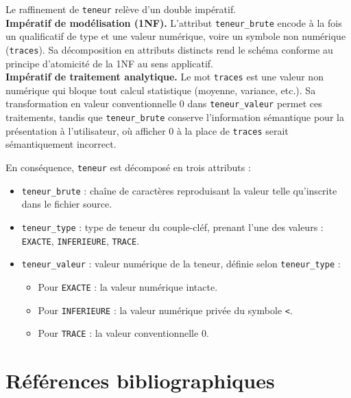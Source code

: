 \documentclass[12pt, a4paper]{article}
\newcommand{\attr}[1]{\texttt{#1}}
\begin{document}
    \begin{notebox}
        \small
        Le raffinement de \attr{teneur} relève d'un double impératif.\\[0.3em]
        \textbf{Impératif de modélisation (1NF).} L'attribut \attr{teneur\_brute} encode à la fois un
        qualificatif de type et une valeur numérique, voire un symbole non numérique (\texttt{traces}). Sa
        décomposition en attributs distincts rend le schéma conforme au principe d'atomicité de la
        1NF au sens applicatif.\\[0.3em]
        \textbf{Impératif de traitement analytique.} Le mot \texttt{traces} est une valeur non numérique
        qui bloque tout calcul statistique (moyenne, variance, etc.). Sa transformation en valeur
        conventionnelle $0$ dans \attr{teneur\_valeur} permet ces traitements, tandis que
        \attr{teneur\_brute} conserve l'information sémantique pour la présentation à l'utilisateur, où
        afficher $0$ à la place de \texttt{traces} serait sémantiquement incorrect.
    \end{notebox}

    En conséquence, \attr{teneur} est décomposé en trois attributs :

    \begin{itemize}
        \item \attr{teneur\_brute} : chaîne de caractères reproduisant la valeur telle qu'inscrite dans le
        fichier source.
        \item \attr{teneur\_type} : type de teneur du couple-cléf, prenant l'une des valeurs :
        \texttt{EXACTE}, \texttt{INFERIEURE}, \texttt{TRACE}.
        \item \attr{teneur\_valeur} : valeur numérique de la teneur, définie selon \attr{teneur\_type} :
        \begin{itemize}
            \item Pour \texttt{EXACTE} : la valeur numérique intacte.
            \item Pour \texttt{INFERIEURE} : la valeur numérique privée du symbole \texttt{<}.
            \item Pour \texttt{TRACE} : la valeur conventionnelle $0$.
        \end{itemize}
    \end{itemize}

    \newpage


    \section*{Références bibliographiques}
\end{document}
